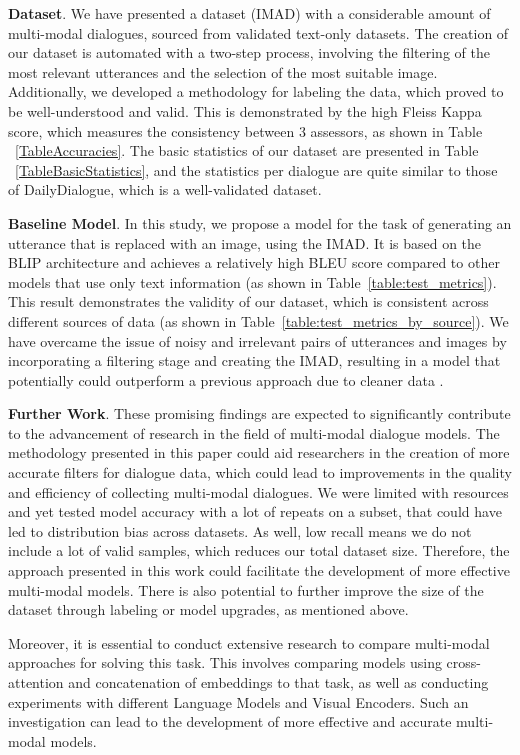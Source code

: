 
\textbf{Dataset}. We have presented a dataset (IMAD) with a considerable amount of multi-modal dialogues, sourced from validated text-only datasets. The creation of our dataset is automated with a two-step process, involving the filtering of the most relevant utterances and the selection of the most suitable image. Additionally, we developed a methodology for labeling the data, which proved to be well-understood and valid. This is demonstrated by the high Fleiss Kappa score, which measures the consistency between 3 assessors, as shown in Table ~\ref{TableAccuracies}. The basic statistics of our dataset are presented in Table ~\ref{TableBasicStatistics}, and the statistics per dialogue are quite similar to those of DailyDialogue, which is a well-validated dataset.

\smallskip

\textbf{Baseline Model}. In this study, we propose a model for the task of generating an utterance that is replaced with an image, using the IMAD. It is based on the BLIP architecture and achieves a relatively high BLEU score compared to other models that use only text information (as shown in Table~\ref{table:test_metrics}). This result demonstrates the validity of our dataset, which is consistent across different sources of data (as shown in Table~\ref{table:test_metrics_by_source}). We have overcame the issue of noisy and irrelevant pairs of utterances and images by incorporating a filtering stage and creating the IMAD, resulting in a model that potentially could outperform a previous approach due to cleaner data \cite{mm_chat}.

\smallskip

\textbf{Further Work}. These promising findings are expected to significantly contribute to the advancement of research in the field of multi-modal dialogue models. The methodology presented in this paper could aid researchers in the creation of more accurate filters for dialogue data, which could lead to improvements in the quality and efficiency of collecting multi-modal dialogues. We were limited with resources and yet tested model accuracy with a lot of repeats on a subset, that could have led to distribution bias across datasets. As well, low recall means we do not include a lot of valid samples, which reduces our total dataset size. Therefore, the approach presented in this work could facilitate the development of more effective multi-modal models. There is also potential to further improve the size of the dataset through labeling or model upgrades, as mentioned above.

\smallskip

Moreover, it is essential to conduct extensive research to compare multi-modal approaches for solving this task. This involves comparing models using cross-attention and concatenation of embeddings to that task, as well as conducting experiments with different Language Models and Visual Encoders. Such an investigation can lead to the development of more effective and accurate multi-modal models.
